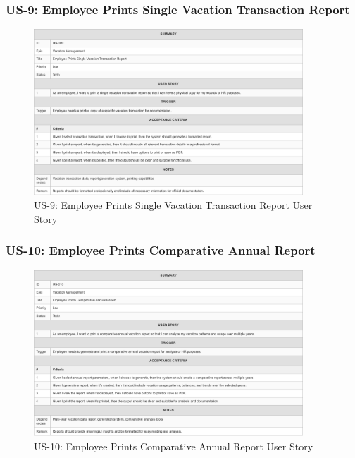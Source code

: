 \documentclass[12pt,a4paper]{article}
\begin{document}
\subsubsection{US-9: Employee Prints Single Vacation Transaction Report}
\begin{figure}[H]
\centering
\includegraphics[width=0.9\textwidth]{User-Stories/US-9-Employee-Prints-Single-Vacation-Transaction-Report/US-9-Employee-Prints-Single-Vacation-Transaction-Report-1.png}
\caption{US-9: Employee Prints Single Vacation Transaction Report User Story}
\label{fig:us9}
\end{figure}

\subsubsection{US-10: Employee Prints Comparative Annual Report}
\begin{figure}[H]
\centering
\includegraphics[width=0.9\textwidth]{User-Stories/US-10-Employee-Prints-Comparative-Annual-Report/US-10-Employee-Prints-Comparative-Annual-Report-1.png}
\caption{US-10: Employee Prints Comparative Annual Report User Story}
\label{fig:us10}
\end{figure}
\end{document}
